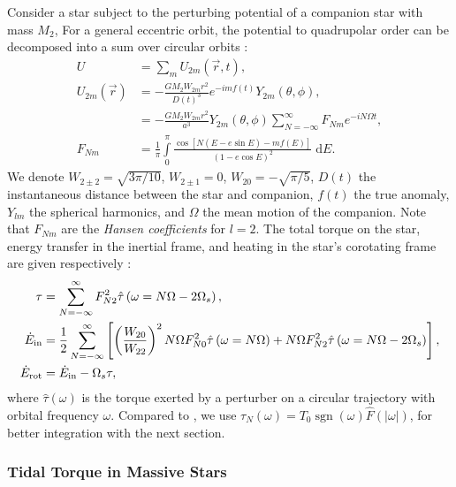 \documentclass[
        fleqn,
        usenatbib,
        referee,
    ]{mnras}
\newcommand*{\abs}[1]{\left|#1\right|}
\newcommand*{\p}[1]{\left(#1\right)}
\newcommand*{\s}[1]{\left[#1\right]}
\DeclareMathOperator*{\sgn}{sgn}
\begin{document}
Consider a star subject to the perturbing potential of a companion star with
mass $M_2$, For a general eccentric orbit, the potential to quadrupolar order
can be decomposed into a sum over circular orbits \citep{sl,vlf}:
\begin{align}
    U &= \sum\limits_m U_{2m} \p{\vec{r}, t},\label{eq:u_ecc}\\
    U_{2m}\p{\vec{r}} &= -\frac{GM_2 W_{2m} r^2}{D(t)^3}
            e^{-imf(t)} Y_{2m}(\theta, \phi),\nonumber\\
        &= -\frac{GM_2W_{2m}r^2}{a^3}Y_{2m}\p{\theta, \phi}
            \sum\limits_{N = -\infty}^\infty F_{Nm}e^{-iN\Omega t},\\
    F_{Nm} &= \frac{1}{\pi}\int\limits_{0}^{\pi}
        \frac{\cos\s{N\p{E - e\sin E} - mf(E)}}
            {\p{1 - e\cos E}^2}\;\mathrm{d}E.
\end{align}
We denote $W_{2 \pm 2} = \sqrt{3\pi/10}$, $W_{2 \pm 1} = 0$, $W_{20} =
-\sqrt{\pi / 5}$, $D(t)$ the instantaneous distance between the star and
companion, $f(t)$ the true anomaly, $Y_{lm}$ the spherical harmonics, and
$\Omega$ the mean motion of the companion. Note that $F_{Nm}$ are the
\emph{Hansen coefficients} for $l = 2$. The total torque on the star, energy
transfer in the inertial frame, and heating in the star's corotating frame are
given respectively
\citep{vlf}:
\begin{align}
    \tau &= \sum\limits_{N = -\infty}^\infty F_{N2}^2
        \hat{\tau}\p{\omega =
        N\Omega - 2\Omega_s},\label{eq:tau_each}
        \\
    \dot{E}_{\rm in} &=
        \frac{1}{2}\sum\limits_{N = -\infty}^\infty\s{
            \p{\frac{W_{20}}{W_{22}}}^2 N\Omega F_{N0}^2
            \hat{\tau}\p{\omega = N\Omega}
            + N\Omega F_{N2}^2 \hat{\tau}\p{\omega =
            N\Omega - 2\Omega_s}},\label{eq:edot_in}\\
    \dot{E}_{\rm rot} &= \dot{E}_{\rm in} - \Omega_s \tau \label{eq:edot_rot},
\end{align}
where $\hat{\tau}(\omega)$ is the torque exerted by a perturber on a circular
trajectory with orbital frequency $\omega$. Compared to \citet{vlf}, we use
$\tau_N(\omega) = T_0 \sgn(\omega) \hat{F}(\abs{\omega})$, for better
integration with the next section.

\subsubsection{Tidal Torque in Massive Stars}
\end{document}
